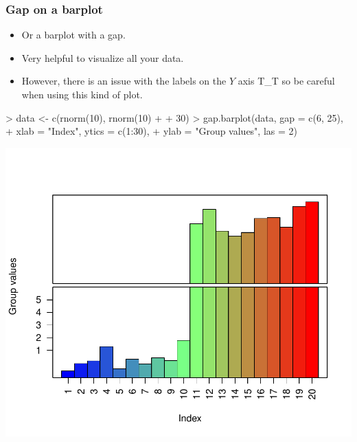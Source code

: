 \begin{frame}
  \frametitle{Gap on a barplot}
  \begin{itemize}
  \item Or a barplot with a gap.
  \item Very helpful to visualize all your data.
  \item However, there is an issue with the labels on the $Y$ axis T\_T so be careful when using this kind of plot.
  \end{itemize}
\begin{Schunk}
\begin{Sinput}
> data <- c(rnorm(10), rnorm(10) + 
+     30)
> gap.barplot(data, gap = c(6, 25), 
+     xlab = "Index", ytics = c(1:30), 
+     ylab = "Group values", las = 2)
\end{Sinput}
\end{Schunk}
\includegraphics{plots/fig-027}
\end{frame}

